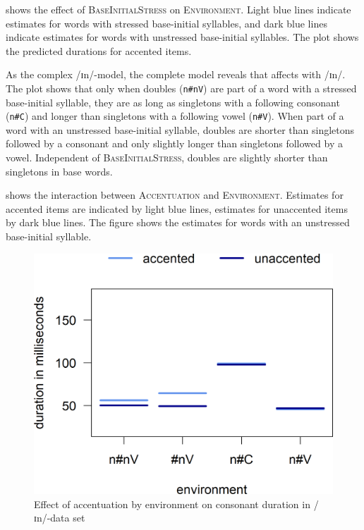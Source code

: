  shows the effect of \textsc{BaseInitialStress} on \textsc{Environment}. Light blue lines indicate estimates for words with stressed base-initial syllables, and dark blue lines indicate estimates for words with unstressed base-initial syllables. The plot shows the predicted durations for accented items.



As the complex /ɪn/-model, the complete model reveals that  affects  with /ɪn/. 
The plot shows that only when doubles (\texttt{n\#nV}) are part of a word with a stressed base-initial syllable, they are as long as singletons with a following consonant  (\texttt{n\#C}) and longer than singletons with a following vowel  (\texttt{n\#V}). When part of a word with an unstressed base-initial syllable, doubles are shorter than singletons followed by a consonant and only slightly longer than singletons followed by a vowel. Independent of \textsc{BaseInitialStress}, doubles are slightly shorter than singletons in base words.




 shows the interaction between \textsc{Accentuation} and \textsc{Environment}. Estimates for accented items are indicated by light blue lines, estimates for unaccented items by dark blue lines. The figure shows the estimates for words with an unstressed base-initial syllable. 


	\begin{figure}
		
		
		\includegraphics [scale=0.5] {images/Experiment/InModelCompleteInterEnvAcc} 
		\caption{Effect of accentuation by environment on consonant duration in /ɪn/-data set}
		\label{fig:Env Acc In complete experiment}
	\end{figure}

